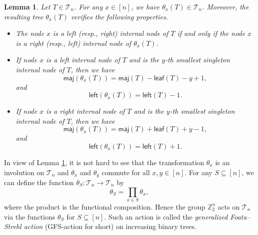 \documentclass[12pt]{article}
\numberwithin{equation}{section}
\theoremstyle{plain}
\newtheorem{lemma}[theorem]{Lemma}
\def\maj{\mathsf{maj}}
\def\l{\mathsf{left}}
\def\l{\mathsf{left}}
\def\B{\mathcal{T}}
\def\leaf{\mathsf{leaf}}
\begin{document}
	 	\begin{lemma}\label{lem-theta}
	 		Let $T\in \B_n$. For any $x\in [n]$, we have $\theta_x(T)\in \B_n$. Moreover,  the resulting tree $\theta_x(T)$ verifies the following properties.
	 		\begin{itemize}
	 			\item The node $x$ is a left (resp.,  right)   internal node of $T$  if and only 
	 			if  the node $x$ is a right  (resp.,  left)   internal node of $\theta_x(T)$.
	 			\item  If node $x$ is a left   internal node of $T$ and  is the $y$-th smallest singleton internal node of $T$, then we have 
	 			$$
	 			\maj(\theta_x(T))=\maj(T)-\leaf(T)-y+1,
	 			$$
	 			and 
	 			$$
	 			\l(\theta_x(T))=\l(T)-1.
	 			$$
	 			
	 			\item  If    node $x$ is a right    internal node of $T$ and is the $y$-th smallest singleton internal node of $T$, then we have 
	 			$$
	 			\maj(\theta_x(T))=\maj(T)+\leaf(T)+y-1,
	 			$$
	 			and 
	 			$$
	 			\l(\theta_x(T))=\l(T)+1.
	 			$$
	 		\end{itemize}
	 	\end{lemma}
	 	
	 	
	 	In view of Lemma \ref{lem-theta}, it is not hard to see that the transformation $\theta_x$ is an involution
	 	on $\B_n$ and $\theta_x$ and $\theta_y$ commute for all $x,y\in [n]$. For any $S\subseteq [n]$, we can define the
	 	function $\theta_S\colon \B_n\to \B_n$ by
	 	\[
	 	\theta_S=\prod_{x\in S}\theta_x,
	 	\]
	 	where the product is the functional composition. Hence the group $\mathbb{Z}_2^{n}$
	 	acts on $\B_n$ via the functions $\theta_S$ for $S\subseteq [n]$.
	 	Such an action is called the {\em generalized Foata–Strehl action }(GFS‑action for short) on increasing binary trees.
	 	
\end{document}
